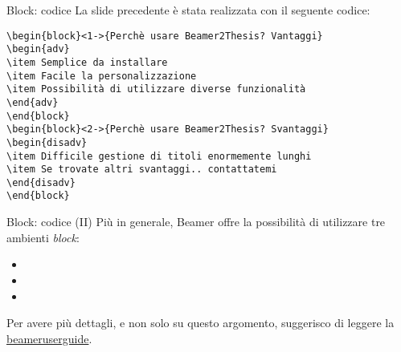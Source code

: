 \begin{frame}[t,fragile]{Block: codice}
La slide precedente è stata realizzata con il seguente codice:
\small{\begin{verbatim}
\begin{block}<1->{Perchè usare Beamer2Thesis? Vantaggi}
\begin{adv}
\item Semplice da installare
\item Facile la personalizzazione
\item Possibilità di utilizzare diverse funzionalità
\end{adv}
\end{block}
\begin{block}<2->{Perchè usare Beamer2Thesis? Svantaggi}
\begin{disadv}
\item Difficile gestione di titoli enormemente lunghi
\item Se trovate altri svantaggi.. contattatemi
\end{disadv}
\end{block}
\end{verbatim}}
\end{frame}

\begin{frame}[t,fragile]{Block: codice (II)}
Più in generale, Beamer offre la possibilità di utilizzare tre ambienti \emph{block}:
\begin{itemize}
\item {}
\item {}
\item {}
\end{itemize}
Per avere più dettagli, e non solo su questo argomento, suggerisco di leggere la \href{http://mirrors.ctan.org/macros/latex/contrib/beamer/doc/beameruserguide.pdf}{beameruserguide}.
\end{frame}